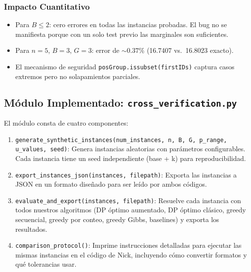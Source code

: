 \documentclass[11pt, a4paper]{article}
\begin{document}
\subsubsection{Impacto Cuantitativo}
\begin{itemize}[nosep]
    \item Para $B \leq 2$: cero errores en todas las instancias probadas.
    El bug no se manifiesta porque con un solo test previo las marginales
    son suficientes.
    \item Para $n=5$, $B=3$, $G=3$: error de $\sim 0.37\%$ (16.7407 vs.\
    16.8023 exacto).
    \item El mecanismo de seguridad \texttt{posGroup.issubset(firstIDs)}
    captura casos extremos pero no solapamientos parciales.
\end{itemize}

\subsection{M\'odulo Implementado: \texttt{cross\_verification.py}}
El m\'odulo consta de cuatro componentes:

\begin{enumerate}[nosep]
    \item \texttt{generate\_synthetic\_instances(num\_instances, n, B, G,
    p\_range, u\_values, seed)}:
    Genera instancias aleatorias con par\'ametros configurables. Cada
    instancia tiene un seed independiente (base + k) para reproducibilidad.

    \item \texttt{export\_instances\_json(instances, filepath)}:
    Exporta las instancias a JSON en un formato dise\~nado para ser
    le\'ido por ambos c\'odigos.

    \item \texttt{evaluate\_and\_export(instances, filepath)}:
    Resuelve cada instancia con todos nuestros algoritmos (DP \'optimo
    aumentado, DP \'optimo cl\'asico, greedy secuencial, greedy por conteo,
    greedy Gibbs, baselines) y exporta los resultados.

    \item \texttt{comparison\_protocol()}:
    Imprime instrucciones detalladas para ejecutar las mismas instancias
    en el c\'odigo de Nick, incluyendo c\'omo convertir formatos y qu\'e
    tolerancias usar.
\end{enumerate}
\end{document}
